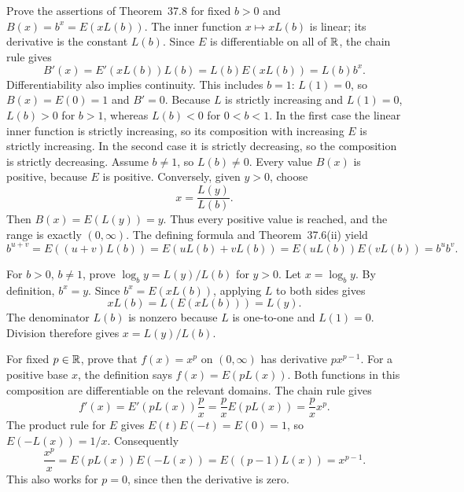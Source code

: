 \goal Prove the assertions of Theorem~37.8 for fixed $b>0$ and
$B(x)=b^x=E(xL(b))$.
The inner function $x\mapsto xL(b)$ is linear; its derivative is
the constant $L(b)$. Since $E$ is differentiable on all of $\mathbb{R}$,
the chain rule gives
\[
 B'(x)=E'(xL(b))L(b)=L(b)E(xL(b))=L(b)b^x.
\]
Differentiability also implies continuity. This includes $b=1$:
$L(1)=0$, so $B(x)=E(0)=1$ and $B'=0$.
Because $L$ is strictly increasing and $L(1)=0$, $L(b)>0$ for
$b>1$, whereas $L(b)<0$ for $0<b<1$. In the first case the
linear inner function is strictly increasing, so its composition
with increasing $E$ is strictly increasing. In the second case it
is strictly decreasing, so the composition is strictly decreasing.
Assume $b\ne1$, so $L(b)\ne0$. Every value $B(x)$ is positive,
because $E$ is positive. Conversely, given $y>0$, choose
\[
 x=\frac{L(y)}{L(b)}.
\]
Then $B(x)=E(L(y))=y$. Thus every positive value is reached, and
the range is exactly $(0,\infty)$.
The defining formula and Theorem~37.6(ii) yield
\[
 b^{u+v}=E((u+v)L(b))
 =E(uL(b)+vL(b))=E(uL(b))E(vL(b))=b^u b^v.
\]

\goal For $b>0$, $b\ne1$, prove $\log_b y=L(y)/L(b)$ for $y>0$.
Let $x=\log_b y$. By definition, $b^x=y$. Since
$b^x=E(xL(b))$, applying $L$ to both sides gives
\[
 xL(b)=L(E(xL(b)))=L(y).
\]
The denominator $L(b)$ is nonzero because $L$ is one-to-one
and $L(1)=0$. Division therefore gives $x=L(y)/L(b)$.

\goal For fixed $p\in\mathbb{R}$, prove that $f(x)=x^p$ on $(0,\infty)$
has derivative $px^{p-1}$.
For a positive base $x$, the definition says
$f(x)=E(pL(x))$. Both functions in this composition are
differentiable on the relevant domains. The chain rule gives
\[
 f'(x)=E'(pL(x))\frac{p}{x}
 =\frac{p}{x}E(pL(x))=\frac{p}{x}x^p.
\]
The product rule for $E$ gives $E(t)E(-t)=E(0)=1$, so
$E(-L(x))=1/x$. Consequently
\[
 \frac{x^p}{x}=E(pL(x))E(-L(x))
 =E((p-1)L(x))=x^{p-1}.
\]
This also works for $p=0$, since then the derivative is zero.

